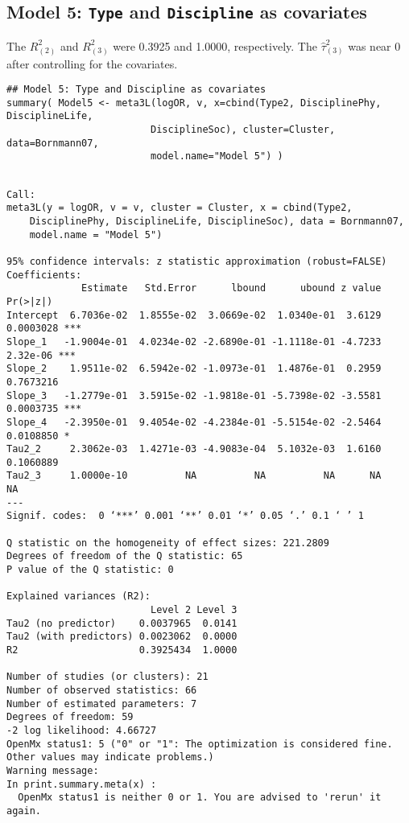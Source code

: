 \documentclass[11pt]{article}
\begin{document}
\subsection{Model 5: \texttt{Type} and \texttt{Discipline} as covariates}
\label{sec:org488821a}
The \(R^2_{(2)}\) and \(R^2_{(3)}\) were 0.3925 and 1.0000, respectively. The \(\hat{\tau}^2_{(3)}\) was near 0 after controlling for the covariates.

\begin{verbatim}
## Model 5: Type and Discipline as covariates
summary( Model5 <- meta3L(logOR, v, x=cbind(Type2, DisciplinePhy, DisciplineLife, 
                         DisciplineSoc), cluster=Cluster, data=Bornmann07,
                         model.name="Model 5") )
\end{verbatim}

\begin{verbatim}

Call:
meta3L(y = logOR, v = v, cluster = Cluster, x = cbind(Type2, 
    DisciplinePhy, DisciplineLife, DisciplineSoc), data = Bornmann07, 
    model.name = "Model 5")

95% confidence intervals: z statistic approximation (robust=FALSE)
Coefficients:
             Estimate   Std.Error      lbound      ubound z value  Pr(>|z|)    
Intercept  6.7036e-02  1.8555e-02  3.0669e-02  1.0340e-01  3.6129 0.0003028 ***
Slope_1   -1.9004e-01  4.0234e-02 -2.6890e-01 -1.1118e-01 -4.7233  2.32e-06 ***
Slope_2    1.9511e-02  6.5942e-02 -1.0973e-01  1.4876e-01  0.2959 0.7673216    
Slope_3   -1.2779e-01  3.5915e-02 -1.9818e-01 -5.7398e-02 -3.5581 0.0003735 ***
Slope_4   -2.3950e-01  9.4054e-02 -4.2384e-01 -5.5154e-02 -2.5464 0.0108850 *  
Tau2_2     2.3062e-03  1.4271e-03 -4.9083e-04  5.1032e-03  1.6160 0.1060889    
Tau2_3     1.0000e-10          NA          NA          NA      NA        NA    
---
Signif. codes:  0 ‘***’ 0.001 ‘**’ 0.01 ‘*’ 0.05 ‘.’ 0.1 ‘ ’ 1

Q statistic on the homogeneity of effect sizes: 221.2809
Degrees of freedom of the Q statistic: 65
P value of the Q statistic: 0

Explained variances (R2):
                         Level 2 Level 3
Tau2 (no predictor)    0.0037965  0.0141
Tau2 (with predictors) 0.0023062  0.0000
R2                     0.3925434  1.0000

Number of studies (or clusters): 21
Number of observed statistics: 66
Number of estimated parameters: 7
Degrees of freedom: 59
-2 log likelihood: 4.66727 
OpenMx status1: 5 ("0" or "1": The optimization is considered fine.
Other values may indicate problems.)
Warning message:
In print.summary.meta(x) :
  OpenMx status1 is neither 0 or 1. You are advised to 'rerun' it again.
\end{verbatim}
\end{document}
